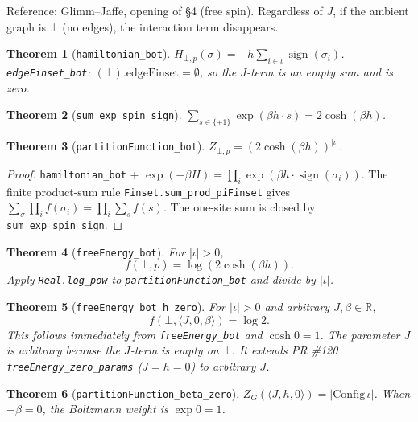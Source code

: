 \documentclass[a4paper,11pt]{article}
\newtheorem{theorem}{Theorem}
\begin{document}
Reference: Glimm--Jaffe, opening of \S 4 (free spin).
Regardless of $J$, if the ambient graph is $\bot$ (no edges), the
interaction term disappears.

\begin{theorem}[\texttt{hamiltonian\_bot}]
$H_{\bot, p}(\sigma) = -h \sum_{i \in \iota} \operatorname{sign}(\sigma_i)$.
\texttt{edgeFinset\_bot}: $(\bot).\text{edgeFinset} = \emptyset$, so the
$J$-term is an empty sum and is zero.
\end{theorem}

\begin{theorem}[\texttt{sum\_exp\_spin\_sign}]
$\sum_{s \in \{\pm 1\}} \exp(\beta h \cdot s) = 2 \cosh(\beta h)$.
\end{theorem}

\begin{theorem}[\texttt{partitionFunction\_bot}]
$Z_{\bot, p} = (2 \cosh(\beta h))^{|\iota|}$.
\end{theorem}

\begin{proof}
\texttt{hamiltonian\_bot} + $\exp(-\beta H) = \prod_i \exp(\beta h \cdot \operatorname{sign}(\sigma_i))$.
The finite product-sum rule \texttt{Finset.sum\_prod\_piFinset} gives
$\sum_\sigma \prod_i f(\sigma_i) = \prod_i \sum_s f(s)$.
The one-site sum is closed by \texttt{sum\_exp\_spin\_sign}.
\end{proof}

\begin{theorem}[\texttt{freeEnergy\_bot}]
For $|\iota| > 0$,
\[
  f(\bot, p) = \log(2 \cosh(\beta h)).
\]
Apply \texttt{Real.log\_pow} to \texttt{partitionFunction\_bot} and divide
by $|\iota|$.
\end{theorem}

\begin{theorem}[\texttt{freeEnergy\_bot\_h\_zero}]
For $|\iota| > 0$ and arbitrary $J, \beta \in \mathbb R$,
\[
  f(\bot, \langle J, 0, \beta \rangle) = \log 2.
\]
This follows immediately from \texttt{freeEnergy\_bot} and $\cosh 0 = 1$.
The parameter $J$ is arbitrary because the $J$-term is empty on $\bot$.
It extends PR \#120 \texttt{freeEnergy\_zero\_params} ($J = h = 0$) to
arbitrary $J$.
\end{theorem}

\begin{theorem}[\texttt{partitionFunction\_beta\_zero}]
$Z_G(\langle J, h, 0 \rangle) = |\text{Config}\,\iota|$.
When $-\beta = 0$, the Boltzmann weight is $\exp 0 = 1$.
\end{theorem}
\end{document}
